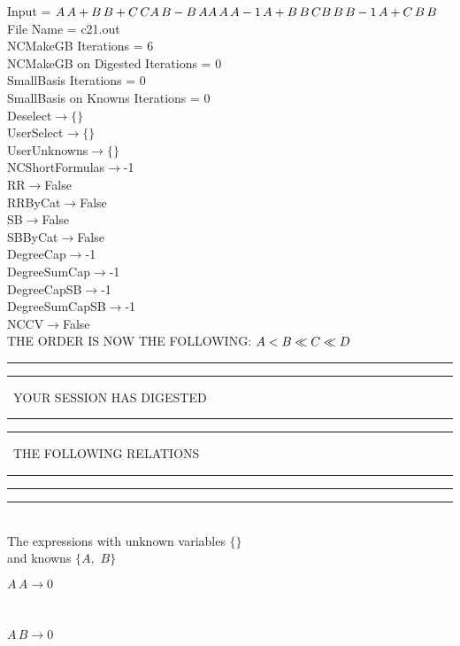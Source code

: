 \documentclass[rep10,leqno]{report}
\begin{document}
\normalsize
\baselineskip=12pt
\noindent
Input = 
$
\\A\,
 A + B\,
 B + C\,
 C\\
A\,
 B - B\,
 A\\
A\,
 A\,
 A\\
-1\,
 A + B\,
 B\,
 C\\
B\,
 B\,
 B\\
-1\,
 A + C\,
 B\,
 B\\
$
File Name = c21.out\\
NCMakeGB Iterations = 6\\
NCMakeGB on Digested Iterations = 0\\
SmallBasis Iterations = 0\\
SmallBasis on Knowns Iterations = 0\\
Deselect$\rightarrow \{\}$\\
UserSelect$\rightarrow \{\}$\\
UserUnknowns$\rightarrow \{\}$\\
NCShortFormulas$\rightarrow$-1\\
RR$\rightarrow $False\\
RRByCat$\rightarrow $False\\
SB$\rightarrow $False\\
SBByCat$\rightarrow $False\\
DegreeCap$\rightarrow $-1\\
DegreeSumCap$\rightarrow $-1\\
DegreeCapSB$\rightarrow $-1\\
DegreeSumCapSB$\rightarrow $-1\\
NCCV$\rightarrow $False\\
THE ORDER IS NOW THE FOLLOWING:\hfil\break
$
A<B\ll
C\ll
D\\
$
\rule[2pt]{6in}{4pt}\hfil\break
\rule[2pt]{1.879in}{4pt}
\ YOUR SESSION HAS DIGESTED\ 
\rule[2pt]{1.879in}{4pt}\hfil\break
\rule[2pt]{1.923in}{4pt}
\ THE FOLLOWING RELATIONS\ 
\rule[2pt]{1.923in}{4pt}\hfil\break
\rule[2pt]{6in}{4pt}\hfil\break
\rule[3pt]{6in}{.7pt}\\
The expressions with unknown variables $\{\}$\\
and knowns $\{A,
$ $
B\}$\smallskip\\
\begin{minipage}{6in}
$
A\,
 A\rightarrow 0
$
\end{minipage}\medskip \\
\begin{minipage}{6in}
$
A\,
 B\rightarrow 0
$
\end{minipage}\medskip \\
\end{document}
